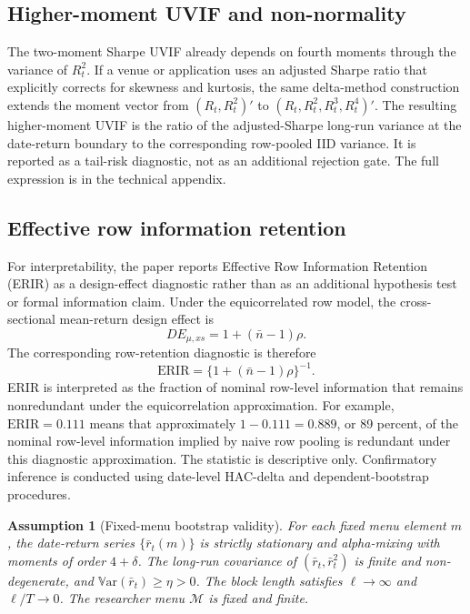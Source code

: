 \documentclass[12pt,a4paper]{article}
\newtheorem{assumption}{Assumption}
\newcommand{\Var}{\mathbb{V}\mathrm{ar}}
\begin{document}
\subsection{Higher-moment UVIF and non-normality}

The two-moment Sharpe UVIF already depends on fourth moments through the
variance of \(R_t^2\).  If a venue or application uses an adjusted Sharpe
ratio that explicitly corrects for skewness and kurtosis, the same
delta-method construction extends the moment vector from
\((R_t,R_t^2)'\) to \((R_t,R_t^2,R_t^3,R_t^4)'\).  The resulting
higher-moment UVIF is the ratio of the adjusted-Sharpe long-run variance
at the date-return boundary to the corresponding row-pooled IID variance.
It is reported as a tail-risk diagnostic, not as an additional rejection
gate.  The full expression is in the technical appendix.

\subsection{Effective row information retention}

For interpretability, the paper reports Effective Row Information
Retention (ERIR) as a design-effect diagnostic rather than as an
additional hypothesis test or formal information claim.  Under the
equicorrelated row model, the cross-sectional mean-return design effect is
\begin{equation}
  DE_{\mu,xs}=1+(\bar n-1)\rho .
\end{equation}
The corresponding row-retention diagnostic is therefore
\begin{equation}
  \mathrm{ERIR}=\{1+(\bar n-1)\rho\}^{-1}.
  \label{eq:erir}
\end{equation}
ERIR is interpreted as the fraction of nominal row-level information
that remains nonredundant under the equicorrelation approximation.  For
example, \(\mathrm{ERIR}=0.111\) means that approximately
\(1-0.111=0.889\), or 89 percent, of the nominal row-level information
implied by naive row pooling is redundant under this diagnostic
approximation.  The statistic is descriptive only.  Confirmatory
inference is conducted using date-level HAC-delta and
dependent-bootstrap procedures.

\begin{assumption}[Fixed-menu bootstrap validity]
For each fixed menu element \(m\), the date-return series
\(\{\bar r_t(m)\}\) is strictly stationary and alpha-mixing with moments
of order \(4+\delta\).  The long-run covariance of
\((\bar r_t,\bar r_t^2)\) is finite and non-degenerate, and
\(\Var(\bar r_t)\ge\eta>0\).  The block length satisfies
\(\ell\to\infty\) and \(\ell/T\to0\).  The researcher menu
\(\mathcal M\) is fixed and finite.
\end{assumption}
\end{document}
